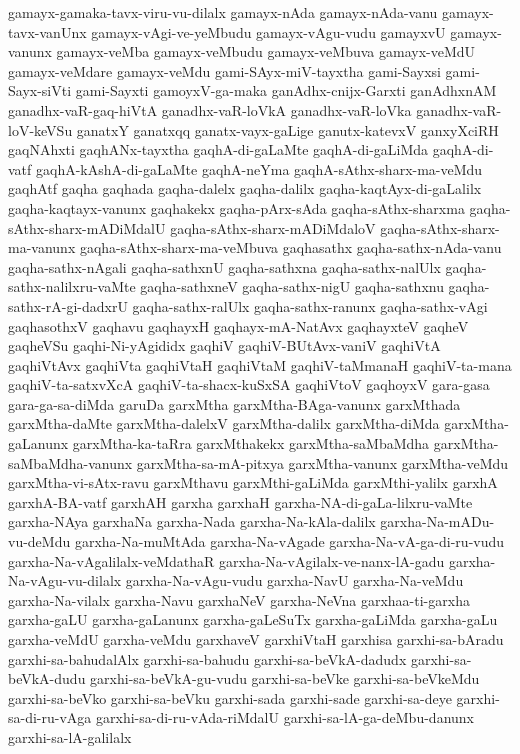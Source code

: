 {gamayx-gamaka-tavx-viru-vu-dilalx
gamayx-nAda
gamayx-nAda-vanu
gamayx-tavx-vanUnx
gamayx-vAgi-ve-yeMbudu
gamayx-vAgu-vudu
gamayxvU
gamayx-vanunx
gamayx-veMba
gamayx-veMbudu
gamayx-veMbuva
gamayx-veMdU
gamayx-veMdare
gamayx-veMdu
gami-SAyx-miV-tayxtha
gami-Sayxsi
gami-Sayx-siVti
gami-Sayxti
gamoyxV-ga-maka
ganAdhx-cnijx-Garxti
ganAdhxnAM
ganadhx-vaR-gaq-hiVtA
ganadhx-vaR-loVkA
ganadhx-vaR-loVka
ganadhx-vaR-loV-keVSu
ganatxY
ganatxqq
ganatx-vayx-gaLige
ganutx-katevxV
ganxyXciRH
gaqNAhxti
gaqhANx-tayxtha
gaqhA-di-gaLaMte
gaqhA-di-gaLiMda
gaqhA-di-vatf
gaqhA-kAshA-di-gaLaMte
gaqhA-neYma
gaqhA-sAthx-sharx-ma-veMdu
gaqhAtf
gaqha
gaqhada
gaqha-dalelx
gaqha-dalilx
gaqha-kaqtAyx-di-gaLalilx
gaqha-kaqtayx-vanunx
gaqhakekx
gaqha-pArx-sAda
gaqha-sAthx-sharxma
gaqha-sAthx-sharx-mADiMdalU
gaqha-sAthx-sharx-mADiMdaloV
gaqha-sAthx-sharx-ma-vanunx
gaqha-sAthx-sharx-ma-veMbuva
gaqhasathx
gaqha-sathx-nAda-vanu
gaqha-sathx-nAgali
gaqha-sathxnU
gaqha-sathxna
gaqha-sathx-nalUlx
gaqha-sathx-nalilxru-vaMte
gaqha-sathxneV
gaqha-sathx-nigU
gaqha-sathxnu
gaqha-sathx-rA-gi-dadxrU
gaqha-sathx-ralUlx
gaqha-sathx-ranunx
gaqha-sathx-vAgi
gaqhasothxV
gaqhavu
gaqhayxH
gaqhayx-mA-NatAvx
gaqhayxteV
gaqheV
gaqheVSu
gaqhi-Ni-yAgididx
gaqhiV
gaqhiV-BUtAvx-vaniV
gaqhiVtA
gaqhiVtAvx
gaqhiVta
gaqhiVtaH
gaqhiVtaM
gaqhiV-taMmanaH
gaqhiV-ta-mana
gaqhiV-ta-satxvXcA
gaqhiV-ta-shacx-kuSxSA
gaqhiVtoV
gaqhoyxV
gara-gasa
gara-ga-sa-diMda
garuDa
garxMtha
garxMtha-BAga-vanunx
garxMthada
garxMtha-daMte
garxMtha-dalelxV
garxMtha-dalilx
garxMtha-diMda
garxMtha-gaLanunx
garxMtha-ka-taRra
garxMthakekx
garxMtha-saMbaMdha
garxMtha-saMbaMdha-vanunx
garxMtha-sa-mA-pitxya
garxMtha-vanunx
garxMtha-veMdu
garxMtha-vi-sAtx-ravu
garxMthavu
garxMthi-gaLiMda
garxMthi-yalilx
garxhA
garxhA-BA-vatf
garxhAH
garxha
garxhaH
garxha-NA-di-gaLa-lilxru-vaMte
garxha-NAya
garxhaNa
garxha-Nada
garxha-Na-kAla-dalilx
garxha-Na-mADu-vu-deMdu
garxha-Na-muMtAda
garxha-Na-vAgade
garxha-Na-vA-ga-di-ru-vudu
garxha-Na-vAgalilalx-veMdathaR
garxha-Na-vAgilalx-ve-nanx-lA-gadu
garxha-Na-vAgu-vu-dilalx
garxha-Na-vAgu-vudu
garxha-NavU
garxha-Na-veMdu
garxha-Na-vilalx
garxha-Navu
garxhaNeV
garxha-NeVna
garxhaa-ti-garxha
garxha-gaLU
garxha-gaLanunx
garxha-gaLeSuTx
garxha-gaLiMda
garxha-gaLu
garxha-veMdU
garxha-veMdu
garxhaveV
garxhiVtaH
garxhisa
garxhi-sa-bAradu
garxhi-sa-bahudalAlx
garxhi-sa-bahudu
garxhi-sa-beVkA-dadudx
garxhi-sa-beVkA-dudu
garxhi-sa-beVkA-gu-vudu
garxhi-sa-beVke
garxhi-sa-beVkeMdu
garxhi-sa-beVko
garxhi-sa-beVku
garxhi-sada
garxhi-sade
garxhi-sa-deye
garxhi-sa-di-ru-vAga
garxhi-sa-di-ru-vAda-riMdalU
garxhi-sa-lA-ga-deMbu-danunx
garxhi-sa-lA-galilalx
}
